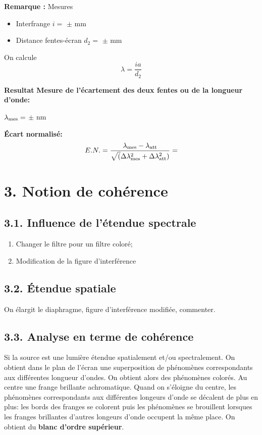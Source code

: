 \documentclass[french, a4paper, 10pt, twocolumn, landscape]{article}
\begin{document}
\textbf{Remarque : }{Mesures }
	\begin{itemize}
		\item Interfrange $i = $  $\pm$  mm
		\item Distance fentes-écran $d_2 = $  $\pm$ mm
	\end{itemize}


On calcule $$\lambda = \frac{ia}{d_2}$$

\textbf{Resultat}
	\textbf{Mesure de l'écartement des deux fentes ou de la longueur d'onde:}\medskip

	$\lambda_{\rm mes} = $ $\pm$  nm

\noindent \textbf{Écart normalisé:}
\[E.N. = \frac{\lambda_{\rm mes}- \lambda_{\rm att}}{\sqrt(\Delta \lambda_{\rm mes}^2+\Delta \lambda_{\rm att}^2 )} = \]



\section*{3. Notion de cohérence}
\subsection*{3.1. Influence de l'étendue spectrale}
\begin{enumerate}
    \item Changer le filtre pour un filtre coloré;
    \item Modification de la figure d'interférence
\end{enumerate}

\subsection*{3.2. Étendue spatiale}
On élargit le diaphragme, figure d'interférence modifiée, commenter.
\subsection*{3.3. Analyse en terme de cohérence}

Si la source est une lumière étendue spatialement et/ou spectralement. On obtient dans le plan de l'écran une superposition de phénomènes correspondants aux différentes longueur d'ondes. On obtient alors des phénomènes colorés. Au centre une frange brillante achromatique. Quand on s'éloigne du centre, les phénomènes correspondants aux différentes longeurs d'onde se décalent de plus en plus: les bords des franges se colorent puis les phénomènes se brouillent lorsques les franges brillantes d'autres longeurs d'onde occupent la même place. On obtient du \textbf{blanc d'ordre supérieur}.
\end{document}
